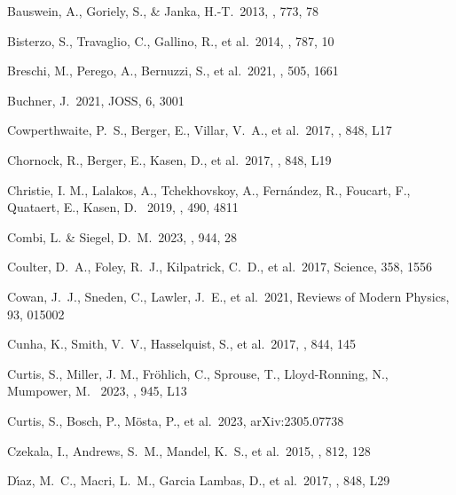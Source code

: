 \documentclass[twocolumn,twocolappendix]{aastex63}
\begin{document}
{{{{{{{{\begin{thebibliography}{}
 Bauswein, A., Goriely, S., \& Janka, H.-T.\ 2013, \apj, 773, 78


 Bisterzo, S., Travaglio, C., Gallino, R., et al.\ 2014, \apj, 787, 10


 Breschi, M., Perego, A., Bernuzzi, S., et al.\ 2021, \mnras, 505, 1661

 Buchner, J.\ 2021, JOSS, 6, 3001


 Cowperthwaite, P.~S., Berger, E., Villar, V.~A., et al.\ 2017, \apjl, 848, L17


 Chornock, R., Berger, E., Kasen, D., et al.\ 2017, \apjl, 848, L19


 Christie, I. M., Lalakos, A., Tchekhovskoy, A., Fern\'andez, R., Foucart, F., Quataert, E., Kasen, D. \ 2019, \mnras, 490, 4811


 Combi, L. \& Siegel, D.~M.\ 2023, \apj, 944, 28


 Coulter, D.~A., Foley, R.~J., Kilpatrick, C.~D., et al.\ 2017, Science, 358, 1556


 Cowan, J.~J., Sneden, C., Lawler, J.~E., et al.\ 2021, Reviews of Modern Physics, 93, 015002


 Cunha, K., Smith, V.~V., Hasselquist, S., et al.\ 2017, \apj, 844, 145


 Curtis, S., Miller, J. M., Fr\"ohlich, C., 
Sprouse, T., Lloyd-Ronning, N., Mumpower, M. \ 2023, \apjl, 945, L13


 Curtis, S., Bosch, P., M{\"o}sta, P., et al.\ 2023, arXiv:2305.07738


 Czekala, I., Andrews, S.~M., Mandel, K.~S., et al.\ 2015, \apj, 812, 128


 D{\'\i}az, M.~C., Macri, L.~M., Garcia Lambas, D., et al.\ 2017, \apjl, 848, L29



\end{thebibliography}}}}}}}}}
\end{document}
